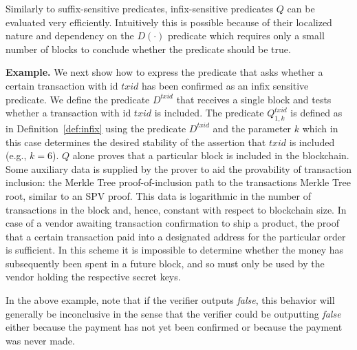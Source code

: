 Similarly to suffix-sensitive predicates, infix-sensitive predicates $Q$ can be
evaluated very efficiently. Intuitively this is possible because of their
localized nature and dependency on the $D(\cdot)$ predicate which requires only
a small number of blocks to conclude whether the predicate should be true.

\noindent\textbf{Example.}
We next show how to express the predicate that asks whether a certain
transaction with id $txid$ has been confirmed as an infix sensitive predicate.
We define the predicate $D^{txid}$ that receives a single block and tests
whether a transaction with id $txid$ is included. The predicate $Q^{txid}_{1,
k}$ is defined as in Definition~\ref{def:infix} using the predicate $D^{txid}$
and the parameter $k$ which in this case determines the desired stability of the
assertion that $txid$ is included (e.g., $k = 6$). $Q$ alone proves that a
particular block is included in the blockchain. Some auxiliary data is supplied
by the prover to aid the provability of transaction inclusion: the Merkle Tree
proof-of-inclusion path to the transactions Merkle Tree root, similar to an SPV
proof. This data is logarithmic in the number of transactions in the block and,
hence, constant with respect to blockchain size. In case of a vendor awaiting
transaction confirmation to ship a product, the proof that a certain transaction
paid into a designated address for the particular order is sufficient. In this
scheme it is impossible to determine whether the money has subsequently been
spent in a future block, and so must only be used by the vendor holding the
respective secret keys.

In the above example, note that if the verifier outputs \emph{false}, this
behavior will generally be inconclusive in the sense that the verifier could be
outputting \emph{false} either because the payment has not yet been confirmed or
because the payment was never made.

